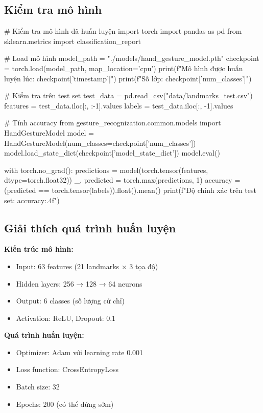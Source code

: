 \subsection{Kiểm tra mô hình}

\begin{aivncodebox}
\begin{python}
# Kiểm tra mô hình đã huấn luyện
import torch
import pandas as pd
from sklearn.metrics import classification_report

# Load mô hình
model_path = "./models/hand_gesture_model.pth"
checkpoint = torch.load(model_path, map_location='cpu')
print(f"Mô hình được huấn luyện lúc: {checkpoint['timestamp']}")
print(f"Số lớp: {checkpoint['num_classes']}")

# Kiểm tra trên test set
test_data = pd.read_csv("data/landmarks_test.csv")
features = test_data.iloc[:, :-1].values
labels = test_data.iloc[:, -1].values

# Tính accuracy
from gesture_recognization.common.models import HandGestureModel
model = HandGestureModel(num_classes=checkpoint['num_classes'])
model.load_state_dict(checkpoint['model_state_dict'])
model.eval()

with torch.no_grad():
    predictions = model(torch.tensor(features, dtype=torch.float32))
    _, predicted = torch.max(predictions, 1)
    accuracy = (predicted == torch.tensor(labels)).float().mean()
    print(f"Độ chính xác trên test set: {accuracy:.4f}")
\end{python}
\end{aivncodebox}

\subsection{Giải thích quá trình huấn luyện}

\textbf{Kiến trúc mô hình:}
\begin{itemize}
    \item Input: 63 features (21 landmarks × 3 tọa độ)
    \item Hidden layers: 256 → 128 → 64 neurons
    \item Output: 6 classes (số lượng cử chỉ)
    \item Activation: ReLU, Dropout: 0.1
\end{itemize}

\textbf{Quá trình huấn luyện:}
\begin{itemize}
    \item Optimizer: Adam với learning rate 0.001
    \item Loss function: CrossEntropyLoss
    \item Batch size: 32
    \item Epochs: 200 (có thể dừng sớm)
\end{itemize}

